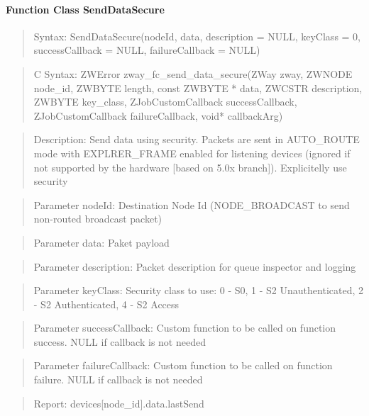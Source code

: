 \paragraph{Function Class SendDataSecure}
\begin{quote}Syntax: SendDataSecure(nodeId, data, description = NULL, keyClass = 0, successCallback = NULL, failureCallback = NULL)\end{quote}
\begin{quote}C Syntax: ZWError zway\_fc\_send\_data\_secure(ZWay zway, ZWNODE node\_id, ZWBYTE length, const ZWBYTE * data, ZWCSTR description, ZWBYTE key\_class, ZJobCustomCallback successCallback, ZJobCustomCallback failureCallback, void* callbackArg)\end{quote}
\begin{quote}Description: Send data using security. Packets are sent in AUTO\_ROUTE mode with EXPLRER\_FRAME enabled for listening devices (ignored if not supported by the hardware [based on 5.0x branch]). Explicitelly use security\end{quote}
\begin{quote}Parameter nodeId: Destination Node Id (NODE\_BROADCAST to send non-routed broadcast packet)\end{quote}
\begin{quote}Parameter data: Paket payload\end{quote}
\begin{quote}Parameter description: Packet description for queue inspector and logging\end{quote}
\begin{quote}Parameter keyClass: Security class to use: 0 - S0, 1 - S2 Unauthenticated, 2 - S2 Authenticated, 4 - S2 Access\end{quote}
\begin{quote}Parameter successCallback: Custom function to be called on function success. NULL if callback is not needed\end{quote}
\begin{quote}Parameter failureCallback: Custom function to be called on function failure. NULL if callback is not needed\end{quote}
\begin{quote}Report: devices[node\_id].data.lastSend\end{quote}


